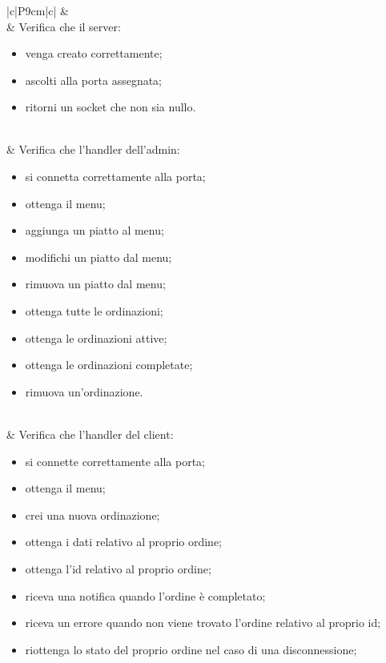 \subsubsection{\DemoName{}}
\begin{longtable}{|c|P{9cm}|c|}
	\hline {} &    \\ 
	\endfirsthead
	\hline {} & Verifica che il server:
	\begin{itemize}
		\item venga creato correttamente;
		\item ascolti alla porta assegnata;
		\item ritorni un socket che non sia nullo.
	\end{itemize}
	 \\
	\hline{}\label{tu-adminhandler} & Verifica che l'handler dell'admin:
	\begin{itemize}
		\item si connetta correttamente alla porta;
		\item ottenga il menu;
		\item aggiunga un piatto al menu;
		\item modifichi un piatto dal menu;
		\item rimuova un piatto dal menu;
		\item ottenga tutte le ordinazioni;
		\item ottenga le ordinazioni attive;
		\item ottenga le ordinazioni completate;
		\item rimuova un'ordinazione.
	\end{itemize}
	  \\
	 \hline{}\label{tu-clienthandler} & Verifica che l'handler del client:
	 \begin{itemize}
	 	\item si connette correttamente alla porta;
	 	\item ottenga il menu;
	 	\item crei una nuova ordinazione;
	 	\item ottenga i dati relativo al proprio ordine;
	 	\item ottenga l'id relativo al proprio ordine;
	 	\item riceva una notifica quando l'ordine è completato;
	 	\item riceva un errore quando non viene trovato l'ordine relativo al proprio id;
	 	\item riottenga lo stato del proprio ordine nel caso di una disconnessione;

\end{itemize}
\end{longtable}
